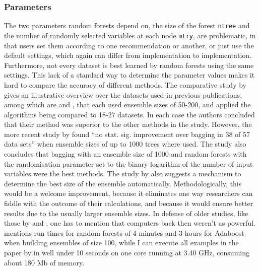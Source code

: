 \documentclass[a4paper,man,12pt,apacite,floatsintext,draftfirst]{apa6} %
\begin{document}
\subsubsection{Parameters}
The two parameters random forests depend on, the size of the forest
\texttt{ntree} and the number of randomly selected variables at each node
\texttt{mtry}, are problematic,
in that users set them according to one recommendation or another,
or just use the default settings, which again can differ from implementation
to implementation.
Furthermore, not every dataset is best learned by random forests using the
same settings.
This lack of a standard way to determine the parameter values makes it hard
to compare the accuracy of different methods.
The comparative study by  gives an
illustrative overview over the datasets used in previous publications,
among which are  and ,
that each used ensemble sizes of 50-200, and applied the algorithms being
compared to 18-27 datasets.
In each case the authors concluded that their method was superior to the
other methods in the study.
However, the more recent study by  found
“no stat. sig. improvement over bagging in 38 of 57 data sets”
when ensemble sizes of up to 1000 trees where used.
The study also concludes that bagging with an ensemble size of 1000 and
random forests with the randomisation parameter set to the
binary logarithm of the number of input variables were the best methods.
The study by  also suggests a mechanism
to determine the best size of the ensemble automatically.
Methodologically, this would be a welcome improvement, because it eliminates
one way researchers can fiddle with the outcome of their calculations,
and because it would ensure better results due to the usually larger
ensemble sizes.
In defense of older studies, like those by  and
, one has to mention that
computers back then weren't as powerful.
 mentions run times for random forests of 4 minutes
and 3 hours for Adaboost when building ensembles of size 100,
while I can execute all examples in the paper by 
in well under 10 seconds on one core running at 3.40 GHz, consuming about 180 Mb
of memory.
\end{document}
